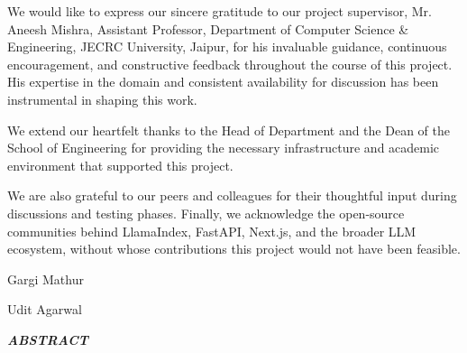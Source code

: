 \documentclass[12pt,a4paper]{report}
\newcommand{\abstracttitlefont}{\fontsize{16pt}{19.2pt}\selectfont\bfseries\itshape}
\begin{document}
\noindent We would like to express our sincere gratitude to our project supervisor, Mr. Aneesh Mishra, Assistant Professor, Department of Computer Science \& Engineering, JECRC University, Jaipur, for his invaluable guidance, continuous encouragement, and constructive feedback throughout the course of this project. His expertise in the domain and consistent availability for discussion has been instrumental in shaping this work.

\noindent We extend our heartfelt thanks to the Head of Department and the Dean of the School of Engineering for providing the necessary infrastructure and academic environment that supported this project.

\noindent We are also grateful to our peers and colleagues for their thoughtful input during discussions and testing phases. Finally, we acknowledge the open-source communities behind LlamaIndex, FastAPI, Next.js, and the broader LLM ecosystem, without whose contributions this project would not have been feasible.

\vspace{2cm}
\noindent Gargi Mathur

\noindent Udit Agarwal

\clearpage

\setcounter{page}{4}
\thispagestyle{plain}

{\abstracttitlefont ABSTRACT}
\vspace{24pt}  %
\end{document}
